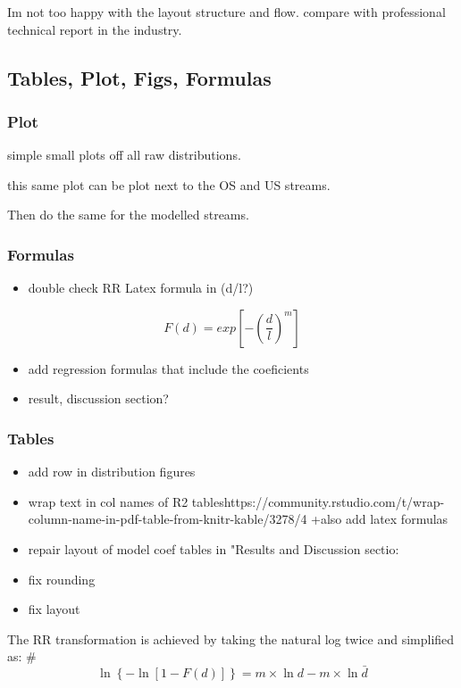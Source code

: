 \documentclass[
]{article}
\providecommand{\tightlist}{%
  \setlength{\itemsep}{0pt}\setlength{\parskip}{0pt}}
\begin{document}
Im not too happy with the layout structure and flow. compare with
professional technical report in the industry.

\hypertarget{tables-plot-figs-formulas}{%
\subsection{Tables, Plot, Figs,
Formulas}\label{tables-plot-figs-formulas}}

\hypertarget{plot}{%
\subsubsection{Plot}\label{plot}}

simple small plots off all raw distributions.

this same plot can be plot next to the OS and US streams.

Then do the same for the modelled streams.

\hypertarget{formulas}{%
\subsubsection{Formulas}\label{formulas}}

\begin{itemize}
\tightlist
\item
  double check RR Latex formula in (d/l?)
\end{itemize}

\[F\left(d\right) = exp\left[-(\frac{d}{l})^{m} \right]\]

\begin{itemize}
\item
  add regression formulas that include the coeficients
\item
  result, discussion section?
\end{itemize}

\hypertarget{tables}{%
\subsubsection{Tables}\label{tables}}

\begin{itemize}
\item
  add row in distribution figures
\item
  wrap text in col names of R2
  tableshttps://community.rstudio.com/t/wrap-column-name-in-pdf-table-from-knitr-kable/3278/4
  +also add latex formulas
\item
  repair layout of model coef tables in "Results and Discussion sectio:
\item
  fix rounding
\item
  fix layout
\end{itemize}

The RR transformation is achieved by taking the natural log twice and
simplified as:
\#\[\ln\left\{-\ln\left[1-F(d)\right] \right\} = m\times \ln d - m\times \ln \bar{d} \]
\end{document}
